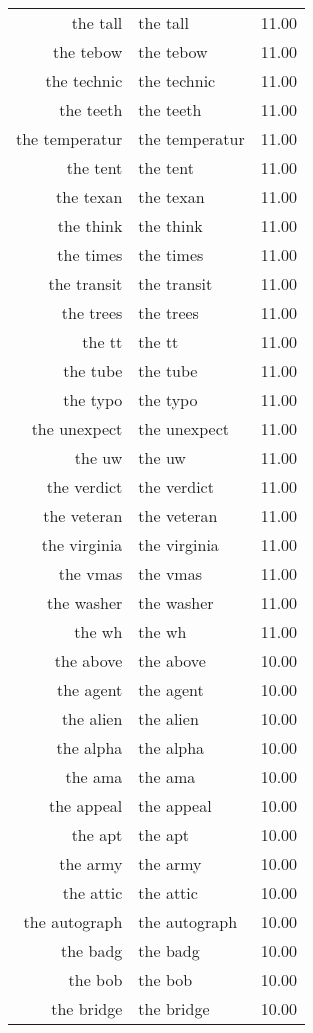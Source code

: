 \begin{table}[ht]
\begin{tabular}{rlr}
  the tall & the tall & 11.00 \\ 
  the tebow & the tebow & 11.00 \\ 
  the technic & the technic & 11.00 \\ 
  the teeth & the teeth & 11.00 \\ 
  the temperatur & the temperatur & 11.00 \\ 
  the tent & the tent & 11.00 \\ 
  the texan & the texan & 11.00 \\ 
  the think & the think & 11.00 \\ 
  the times & the times & 11.00 \\ 
  the transit & the transit & 11.00 \\ 
  the trees & the trees & 11.00 \\ 
  the tt & the tt & 11.00 \\ 
  the tube & the tube & 11.00 \\ 
  the typo & the typo & 11.00 \\ 
  the unexpect & the unexpect & 11.00 \\ 
  the uw & the uw & 11.00 \\ 
  the verdict & the verdict & 11.00 \\ 
  the veteran & the veteran & 11.00 \\ 
  the virginia & the virginia & 11.00 \\ 
  the vmas & the vmas & 11.00 \\ 
  the washer & the washer & 11.00 \\ 
  the wh & the wh & 11.00 \\ 
  the above & the above & 10.00 \\ 
  the agent & the agent & 10.00 \\ 
  the alien & the alien & 10.00 \\ 
  the alpha & the alpha & 10.00 \\ 
  the ama & the ama & 10.00 \\ 
  the appeal & the appeal & 10.00 \\ 
  the apt & the apt & 10.00 \\ 
  the army & the army & 10.00 \\ 
  the attic & the attic & 10.00 \\ 
  the autograph & the autograph & 10.00 \\ 
  the badg & the badg & 10.00 \\ 
  the bob & the bob & 10.00 \\ 
  the bridge & the bridge & 10.00 \\ 

\end{tabular}
\end{table}
